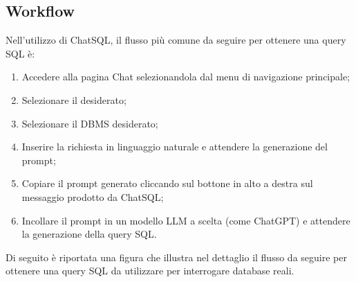 \subsection{Workflow}
\par Nell'utilizzo di ChatSQL, il flusso più comune da seguire per ottenere una query SQL è:
\begin{enumerate}
  \item Accedere alla pagina Chat selezionandola dal menu di navigazione principale;
  \item Selezionare il  desiderato;
  \item Selezionare il DBMS desiderato;
  \item Inserire la richiesta in linguaggio naturale e attendere la generazione del prompt;
  \item Copiare il prompt generato cliccando sul bottone in alto a destra sul messaggio prodotto da ChatSQL;
  \item Incollare il prompt in un modello LLM a scelta (come ChatGPT) e attendere la generazione della query SQL.
\end{enumerate}

\vspace{0.5\baselineskip}
\par Di seguito è riportata una figura che illustra nel dettaglio il flusso da seguire per ottenere una query SQL da utilizzare per interrogare database reali.

